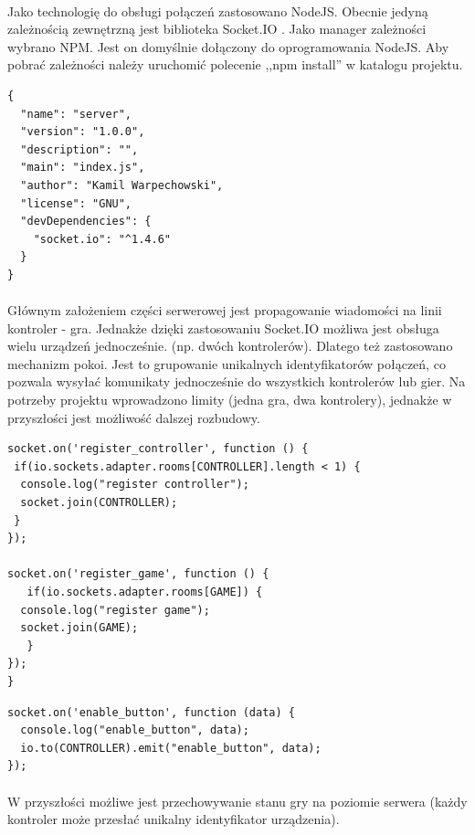 \paragraph{}
Jako technologię do obsługi połączeń zastosowano NodeJS. Obecnie jedyną zależnością zewnętrzną jest biblioteka Socket.IO \cite{socket}.
Jako manager zależności wybrano NPM. Jest on domyślnie dołączony do oprogramowania NodeJS. Aby pobrać zależności należy uruchomić polecenie ,,npm install'' w katalogu projektu.

\begin{lstlisting}[language=CSharp]
{
  "name": "server",
  "version": "1.0.0",
  "description": "",
  "main": "index.js",
  "author": "Kamil Warpechowski",
  "license": "GNU",
  "devDependencies": {
    "socket.io": "^1.4.6"
  }
}
\end{lstlisting}

\paragraph{}
Głównym założeniem części serwerowej jest propagowanie wiadomości na linii kontroler - gra. Jednakże dzięki zastosowaniu Socket.IO możliwa jest obsługa wielu urządzeń jednocześnie. (np. dwóch kontrolerów). Dlatego też zastosowano mechanizm pokoi. Jest to grupowanie unikalnych identyfikatorów połączeń, co pozwala wysyłać komunikaty jednocześnie do wszystkich kontrolerów lub gier. Na potrzeby projektu wprowadzono limity (jedna gra, dwa kontrolery), jednakże w przyszłości jest możliwość dalszej rozbudowy.

\begin{lstlisting}[language=CSharp]
socket.on('register_controller', function () {
 if(io.sockets.adapter.rooms[CONTROLLER].length < 1) {
  console.log("register controller");
  socket.join(CONTROLLER);
 }
});

socket.on('register_game', function () {
   if(io.sockets.adapter.rooms[GAME]) {
  console.log("register game");
  socket.join(GAME);
   }
});
}
\end{lstlisting}
\newpage
\begin{lstlisting}[language=CSharp]
socket.on('enable_button', function (data) {
  console.log("enable_button", data);
  io.to(CONTROLLER).emit("enable_button", data);
});
\end{lstlisting}
\paragraph{}
W przyszłości możliwe jest przechowywanie stanu gry na poziomie serwera (każdy kontroler może przesłać unikalny identyfikator urządzenia).
